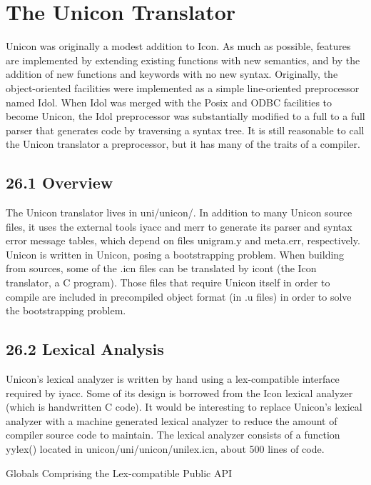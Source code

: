 \chapter{The Unicon Translator}

Unicon was originally a modest addition to Icon. As much as possible,
features are implemented by extending existing functions with new
semantics, and by the addition of new functions and keywords with no
new syntax. Originally, the object-oriented facilities were
implemented as a simple line-oriented preprocessor named Idol.  When
Idol was merged with the Posix and ODBC facilities to become Unicon,
the Idol preprocessor was substantially modified to a full to a full
parser that generates code by traversing a syntax tree. It is still
reasonable to call the Unicon translator a preprocessor, but it has
many of the traits of a compiler.


\section[26.1 Overview]{26.1 Overview}

The Unicon translator lives in uni/unicon/. In addition to many Unicon
source files, it uses the external tools iyacc and merr to generate
its parser and syntax error message tables, which depend on files
unigram.y and meta.err, respectively. Unicon is written in Unicon,
posing a bootstrapping problem. When building from sources, some of
the .icn files can be translated by icont (the Icon translator, a C
program). Those files that require Unicon itself in order to compile
are included in precompiled object format (in .u files) in order to
solve the bootstrapping problem.

\section[26.2 Lexical Analysis]{26.2 Lexical Analysis}

Unicon's lexical analyzer is written by hand using a lex-compatible
interface required by iyacc. Some of its design is borrowed from the
Icon lexical analyzer (which is handwritten C code). It would be
interesting to replace Unicon's lexical analyzer with a machine
generated lexical analyzer to reduce the amount of compiler source
code to maintain. The lexical analyzer consists of a function
yylex() located in unicon/uni/unicon/unilex.icn, about 500 lines of
code.

{\sffamily
Globals Comprising the Lex-compatible Public API }


